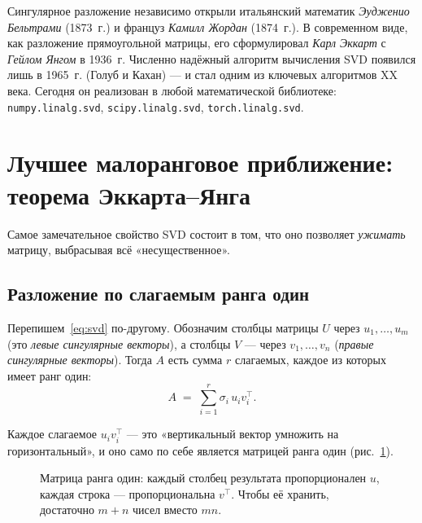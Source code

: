 \begin{historybox}
Сингулярное разложение независимо открыли итальянский математик
\emph{Эудженио Бельтрами} (1873~г.) и француз \emph{Камилл Жордан}
(1874~г.). В современном виде, как разложение прямоугольной матрицы,
его сформулировал \emph{Карл Эккарт} с \emph{Гейлом Янгом} в 1936~г.
Численно надёжный алгоритм вычисления SVD появился лишь в 1965~г.
(Голуб и Кахан) — и стал одним из ключевых алгоритмов XX века. Сегодня
он реализован в любой математической библиотеке: \texttt{numpy.linalg.svd},
\texttt{scipy.linalg.svd}, \texttt{torch.linalg.svd}.
\end{historybox}

\section{Лучшее малоранговое приближение: теорема Эккарта--Янга}
\label{sec:linalg-eckart}

Самое замечательное свойство SVD состоит в том, что оно позволяет
\emph{ужимать} матрицу, выбрасывая всё «несущественное».

\subsection{Разложение по слагаемым ранга один}

Перепишем~\eqref{eq:svd} по-другому. Обозначим столбцы матрицы
$U$ через $u_1,\ldots,u_m$ (это \emph{левые сингулярные векторы}),
а столбцы $V$ — через $v_1,\ldots,v_n$ (\emph{правые сингулярные
векторы}). Тогда $A$ есть сумма $r$ слагаемых, каждое из которых
имеет ранг один:
\begin{equation}\label{eq:svd-sum}
A \;=\; \sum_{i=1}^{r}\sigma_i\,u_i v_i^{\!\top}.
\end{equation}

Каждое слагаемое $u_i v_i^{\!\top}$ — это «вертикальный вектор
умножить на горизонтальный», и оно само по себе является матрицей
ранга один (рис.~\ref{fig:rank1}).

\begin{figure}[ht]
\centering
{}
\caption{Матрица ранга один: каждый столбец результата
пропорционален $u$, каждая строка — пропорциональна $v^{\!\top}$.
Чтобы её хранить, достаточно $m+n$ чисел вместо $mn$.}
\label{fig:rank1}
\end{figure}

